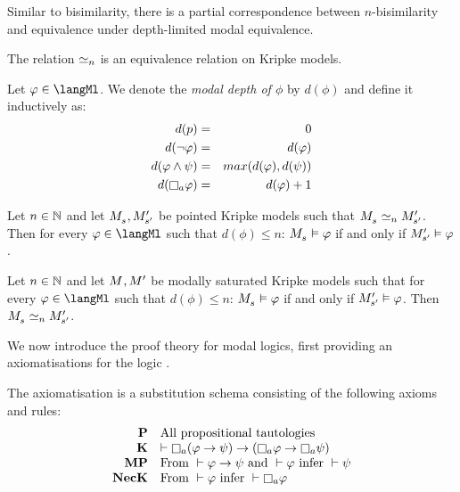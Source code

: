 Similar to bisimilarity, there is a partial correspondence between $n$-bisimilarity and equivalence under depth-limited modal equivalence.

\begin{proposition}
The relation $\bisimilar[n]$ is an equivalence relation on Kripke models.
\end{proposition}

\begin{definition}
Let $\phi \in \langMl$.
We denote the {\em modal depth of $\phi$} by $d(\phi)$ and define it inductively as:
\begin{eqnarray*}
    d(\atomP) &=& 0\\
    d(\lnot \phi) &=& d(\phi)\\
    d(\phi \land \psi) &=& max(d(\phi), d(\psi))\\
    d(\necessaryA \phi) &=& d(\phi) + 1
\end{eqnarray*}
\end{definition}

\begin{proposition}
Let $n \in \naturals$ and let $\kPModel{\kStateS}, \kPModelP{\kStateSP}$ be pointed Kripke models such that $\kPModel{\kStateS} \bisimilar[n] \kPModelP{\kStateSP}$.
Then for every $\phi \in \langMl$ such that $d(\phi) \leq n$:
$\kPModel{\kStateS} \entails \phi$ if and only if $\kPModelP{\kStateSP} \entails \phi$.
\end{proposition}

\begin{proposition}
Let $n \in \naturals$ and let $\kModel, \kModelP$ be modally saturated Kripke models such that for every $\phi \in \langMl$ such that $d(\phi) \leq n$: $\kPModel{\kStateS} \entails \phi$ if and only if $\kPModelP{\kStateSP} \entails \phi$.
Then $\kPModel{\kStateS} \bisimilar[n] \kPModelP{\kStateSP}$.
\end{proposition}

We now introduce the proof theory for modal logics, first providing an axiomatisations for the logic \logicK{}.

\begin{definition}
The axiomatisation \axiomK{} is a substitution schema consisting of the following axioms and rules:
$$
\begin{array}{rl}
    {\bf P}     & \text{All propositional tautologies}\\
    {\bf K}     & \proves \necessaryA (\phi \implies \psi) \implies (\necessaryA \phi \implies \necessaryA \psi)\\
    {\bf MP}    & \text{From } \proves \phi \implies \psi \text{ and } \proves \phi \text{ infer } \proves \psi\\
    {\bf NecK}  & \text{From } \proves \phi \text{ infer } \proves \necessaryA \phi
\end{array}
$$
\end{definition}

